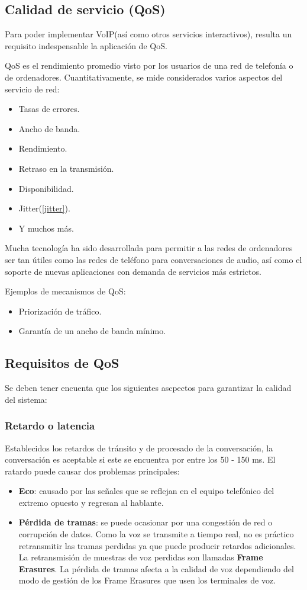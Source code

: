 \documentclass[a4paper, 11pt]{article} %
\begin{document}
		\subsection{Calidad de servicio (QoS)}
		Para poder implementar VoIP(así como otros servicios interactivos), resulta un requisito indespensable la aplicación de QoS.
		
		QoS es el rendimiento promedio visto por los usuarios de una red de telefonía o de ordenadores. Cuantitativamente, se mide considerados varios aspectos del servicio de red:
		\begin{itemize}
			\item Tasas de errores.
			\item Ancho de banda.
			\item Rendimiento.
			\item Retraso en la transmisión.
			\item Disponibilidad.
			\item Jitter(\ref{jitter}).
			\item Y muchos más.
		\end{itemize}
		
		Mucha tecnología ha sido desarrollada para permitir a las redes de ordenadores ser tan útiles como las redes de teléfono para conversaciones de audio, así como el soporte de nuevas aplicaciones con demanda de servicios más estrictos.
		
		Ejemplos de mecanismos de QoS:
		\begin{itemize}
			\item Priorización de tráfico.
			\item Garantía de un ancho de banda mínimo.
		\end{itemize}
	
	\subsection{Requisitos de QoS}
	Se deben tener encuenta que los siguientes ascpectos para garantizar la calidad del sistema:
		
		\subsubsection{Retardo o latencia}
		Establecidos los retardos de tránsito y de procesado de la conversación, la conversación es aceptable si este se encuentra por entre los 50 - 150 ms. 
		El ratardo puede causar dos problemas principales:
		\begin{itemize}
			\item \textbf{Eco}: causado por las señales que se reflejan en el equipo telefónico del extremo opuesto y regresan al hablante.
			\item \textbf{Pérdida de tramas}: se puede ocasionar por una congestión de red o corrupción de datos. Como la voz se transmite a tiempo real, no es práctico retransmitir las tramas perdidas ya que puede producir retardos adicionales. La retransmisión de muestras de voz perdidas son llamadas \textbf{Frame Erasures}. La pérdida de tramas afecta a la calidad de voz dependiendo del modo de gestión de los Frame Erasures que usen los terminales de voz.
		\end{itemize}
		
\end{document}
